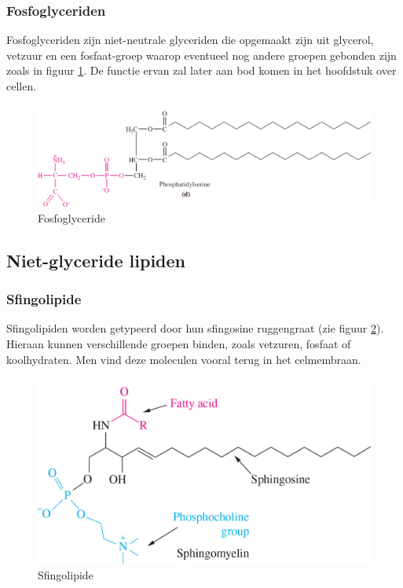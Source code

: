 \documentclass[a4paper,kul]{kulakarticle} %
\begin{document}
\subsubsection{Fosfoglyceriden}
Fosfoglyceriden zijn niet-neutrale glyceriden die opgemaakt zijn uit glycerol, vetzuur en een fosfaat-groep waarop eventueel nog andere groepen gebonden zijn zoals in figuur \ref{fig:fosfoglyeride}. De functie ervan zal later aan bod komen in het hoofdstuk over cellen. 
\begin{figure}[h]
	\centering
	\includegraphics[width=0.7\linewidth]{fosfoglyeride}
	\caption[Fosfoglyceride]{Fosfoglyceride}
	\label{fig:fosfoglyeride}
\end{figure}

\subsection{Niet-glyceride lipiden}
\subsubsection{Sfingolipide}
Sfingolipiden worden getypeerd door hun sfingosine ruggengraat (zie figuur \ref{fig:sfingolipide}). Hieraan kunnen verschillende groepen binden, zoals vetzuren, fosfaat of koolhydraten. Men vind deze moleculen vooral terug in het celmembraan. 
\begin{figure}[h]
	\centering
	\includegraphics[width=0.5\linewidth]{sfingolipide}
	\caption[Sfingolipide]{Sfingolipide}
	\label{fig:sfingolipide}
\end{figure}
\end{document}
